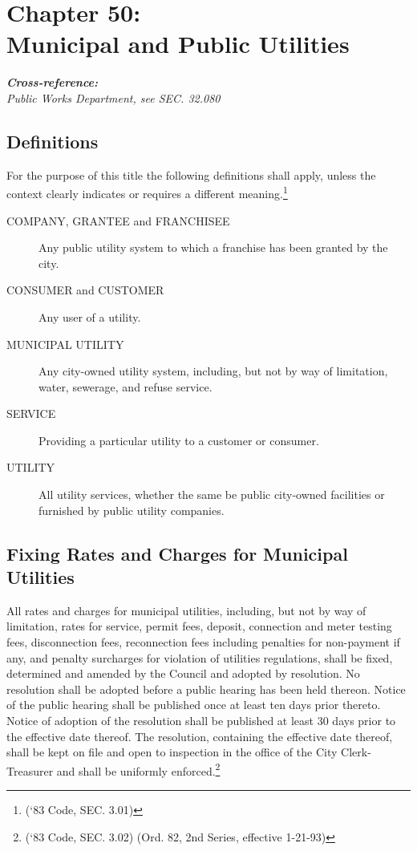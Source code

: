 \chapter*{Chapter 50: \\
	Municipal and Public Utilities}
    \minitoc
    \pagebreak
    \textbf{\emph{{Cross-reference:}}}\\
    \emph{Public Works Department, see SEC. 32.080}
    \pagebreak


\section{Definitions}
For the purpose of this title the following definitions shall apply, unless the context clearly indicates or requires a different meaning.\footnote{(‘83 Code, SEC. 3.01)}
\begin{description}
\item[COMPANY, GRANTEE and FRANCHISEE] Any public utility system to which a franchise has been granted by the city.
\item[CONSUMER and CUSTOMER] Any user of a utility.
\item[MUNICIPAL UTILITY] Any city-owned utility system, including, but not by way of limitation, water, sewerage, and refuse service.
\item[SERVICE] Providing a particular utility to a customer or consumer.
\item[UTILITY] All utility services, whether the same be public city-owned facilities or furnished by public utility companies.
\end{description}

\section{Fixing Rates and Charges for Municipal Utilities}
All rates and charges for municipal utilities, including, but not by way of limitation, rates for service, permit fees, deposit, connection and meter testing fees, disconnection fees, reconnection fees including penalties for non-payment if any, and penalty surcharges for violation of utilities regulations, shall be fixed, determined and amended by the Council and adopted by resolution.  No resolution shall be adopted before a public hearing has been held thereon.  Notice of the public hearing shall be published once at least ten days prior thereto.  Notice of adoption of the resolution shall be published at least 30 days prior to the effective date thereof.  The resolution, containing the effective date thereof, shall be kept on file and open to inspection in the office of the City Clerk-Treasurer and shall be uniformly enforced.\footnote{(‘83 Code, SEC. 3.02) (Ord. 82, 2nd Series, effective 1-21-93)}
